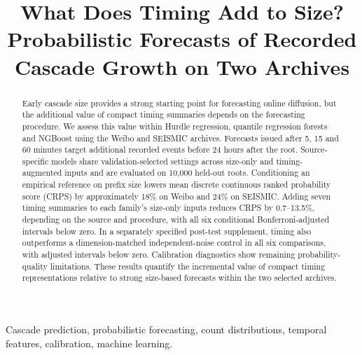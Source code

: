 \documentclass[nolineno]{ieeeaccess}
\begin{document}
\title{What Does Timing Add to Size? Probabilistic Forecasts of Recorded Cascade Growth on Two Archives}

\begin{abstract}Early cascade size provides a strong starting point for forecasting online diffusion, but the additional value of compact timing summaries depends on the forecasting procedure. We assess this value within Hurdle regression, quantile regression forests and NGBoost using the Weibo and SEISMIC archives. Forecasts issued after 5, 15 and 60 minutes target additional recorded events before 24 hours after the root. Source-specific models share validation-selected settings across size-only and timing-augmented inputs and are evaluated on 10,000 held-out roots. Conditioning an empirical reference on prefix size lowers mean discrete continuous ranked probability score (CRPS) by approximately 18\% on Weibo and 24\% on SEISMIC. Adding seven timing summaries to each family's size-only inputs reduces CRPS by 0.7--13.5\%, depending on the source and procedure, with all six conditional Bonferroni-adjusted intervals below zero. In a separately specified post-test supplement, timing also outperforms a dimension-matched independent-noise control in all six comparisons, with adjusted intervals below zero. Calibration diagnostics show remaining probability-quality limitations. These results quantify the incremental value of compact timing representations relative to strong size-based forecasts within the two selected archives.\end{abstract}
\begin{keywords}Cascade prediction, probabilistic forecasting, count distributions, temporal features, calibration, machine learning.\end{keywords}
\titlepgskip=-15pt\maketitle\raggedbottom\pagestyle{brace}\thispagestyle{brace}












\end{document}
